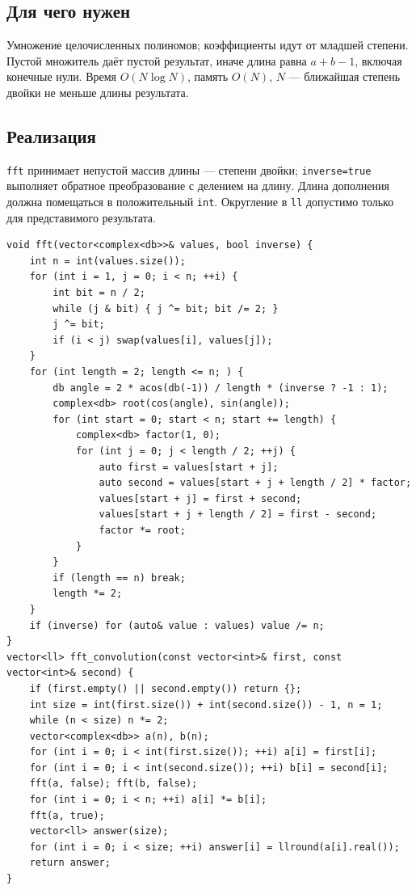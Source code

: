 \subsection*{Для чего нужен}
Умножение целочисленных полиномов; коэффициенты идут от младшей степени.
Пустой множитель даёт пустой результат, иначе длина равна $a+b-1$,
включая конечные нули. Время $O(N\log N)$, память $O(N)$,
$N$ --- ближайшая степень двойки не меньше длины результата.
\subsection*{Реализация}
\texttt{fft} принимает непустой массив длины --- степени двойки;
\texttt{inverse=true} выполняет обратное преобразование с делением на длину.
Длина дополнения должна помещаться в положительный \texttt{int}.
Округление в \texttt{ll} допустимо только для представимого результата.
\begin{lstlisting}[name=supplement_fft]
void fft(vector<complex<db>>& values, bool inverse) {
    int n = int(values.size());
    for (int i = 1, j = 0; i < n; ++i) {
        int bit = n / 2;
        while (j & bit) { j ^= bit; bit /= 2; }
        j ^= bit;
        if (i < j) swap(values[i], values[j]);
    }
    for (int length = 2; length <= n; ) {
        db angle = 2 * acos(db(-1)) / length * (inverse ? -1 : 1);
        complex<db> root(cos(angle), sin(angle));
        for (int start = 0; start < n; start += length) {
            complex<db> factor(1, 0);
            for (int j = 0; j < length / 2; ++j) {
                auto first = values[start + j];
                auto second = values[start + j + length / 2] * factor;
                values[start + j] = first + second;
                values[start + j + length / 2] = first - second;
                factor *= root;
            }
        }
        if (length == n) break;
        length *= 2;
    }
    if (inverse) for (auto& value : values) value /= n;
}
vector<ll> fft_convolution(const vector<int>& first, const vector<int>& second) {
    if (first.empty() || second.empty()) return {};
    int size = int(first.size()) + int(second.size()) - 1, n = 1;
    while (n < size) n *= 2;
    vector<complex<db>> a(n), b(n);
    for (int i = 0; i < int(first.size()); ++i) a[i] = first[i];
    for (int i = 0; i < int(second.size()); ++i) b[i] = second[i];
    fft(a, false); fft(b, false);
    for (int i = 0; i < n; ++i) a[i] *= b[i];
    fft(a, true);
    vector<ll> answer(size);
    for (int i = 0; i < size; ++i) answer[i] = llround(a[i].real());
    return answer;
}
\end{lstlisting}
